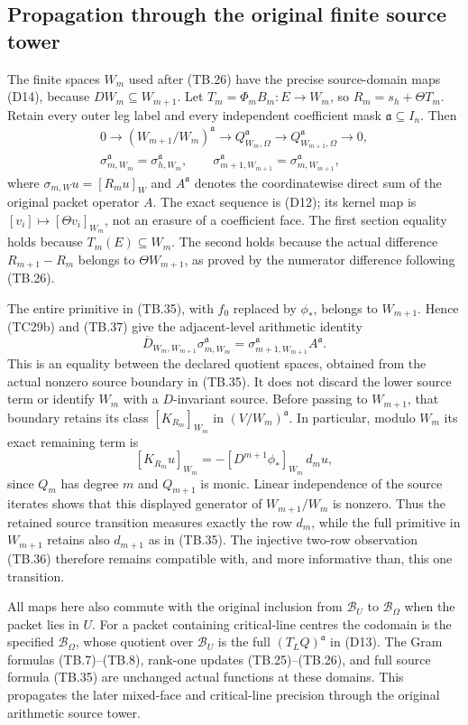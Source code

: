 
\subsection{Propagation through the original finite source tower}
\label{sec:tb-propagated-source-tower}

The finite spaces $W_m$ used after (TB.26) have the precise
source-domain maps (D14), because $DW_m\subseteq W_{m+1}$.
Let $T_m=\Phi_mB_m:E\to W_m$, so
$R_m=s_h+\Theta T_m$.  Retain every outer leg label and every
independent coefficient mask $\mathfrak a\subseteq I_n$.  Then
\[
\begin{gathered}
0\to(W_{m+1}/W_m)^{\mathfrak a}\to Q_{W_m,\Omega}^{\mathfrak a}
       \to Q_{W_{m+1},\Omega}^{\mathfrak a}\to0,\\
\sigma_{m,W_m}^{\mathfrak a}=\sigma_{h,W_m}^{\mathfrak a},
\qquad \sigma_{m+1,W_{m+1}}^{\mathfrak a}=\sigma_{m,W_{m+1}}^{\mathfrak a},
\end{gathered}
\tag{TB.37}
\]
where $\sigma_{m,W}u=[R_mu]_W$ and $A^{\mathfrak a}$ denotes the coordinatewise direct sum of the original packet operator $A$.  The exact sequence is (D12);
its kernel map is $[v_i]\mapsto[\Theta v_i]_{W_m}$, not an
erasure of a coefficient face.  The first section equality holds
because $T_m(E)\subseteq W_m$.  The second holds because the
actual difference $R_{m+1}-R_m$ belongs to $\Theta W_{m+1}$,
as proved by the numerator difference following (TB.26).

The entire primitive in (TB.35), with $f_0$ replaced by $\phi_*$,
belongs to $W_{m+1}$.  Hence (TC29b) and (TB.37) give the
adjacent-level arithmetic identity
\[
\overline D_{W_m,W_{m+1}}\sigma_{m,W_m}^{\mathfrak a}
        =\sigma_{m+1,W_{m+1}}^{\mathfrak a} A^{\mathfrak a}.
\tag{TB.38}
\]
This is an equality between the declared quotient spaces, obtained
from the actual nonzero source boundary in (TB.35).  It does not
discard the lower source term or identify $W_m$ with a
$D$-invariant source.  Before passing to $W_{m+1}$, that boundary
retains its class $[K_{R_m}]_{W_m}$ in $(V/W_m)^{\mathfrak a}$.
In particular, modulo $W_m$ its exact remaining term is
\[
[K_{R_m}u]_{W_m}
       =-[D^{m+1}\phi_*]_{W_m}\,d_mu,
\tag{TB.39}
\]
since $Q_m$ has degree $m$ and $Q_{m+1}$ is monic.  Linear
independence of the source iterates shows that this displayed
generator of $W_{m+1}/W_m$ is nonzero.  Thus the retained source
transition measures exactly the row $d_m$, while the full
primitive in $W_{m+1}$ retains also $d_{m+1}$ as in (TB.35).
The injective two-row observation (TB.36) therefore remains
compatible with, and more informative than, this one transition.

All maps here also commute with the original inclusion from
$\mathscr B_U$ to $\mathscr B_\Omega$ when the packet lies in $U$.
For a packet containing critical-line centres the codomain is
the specified $\mathscr B_\Omega$, whose quotient over
$\mathscr B_U$ is the full $(T_LQ)^{\mathfrak a}$ in (D13).  The Gram formulas
(TB.7)--(TB.8), rank-one updates (TB.25)--(TB.26), and full
source formula (TB.35) are unchanged actual functions at these
domains.  This propagates the later mixed-face and critical-line
precision through the original arithmetic source tower.
